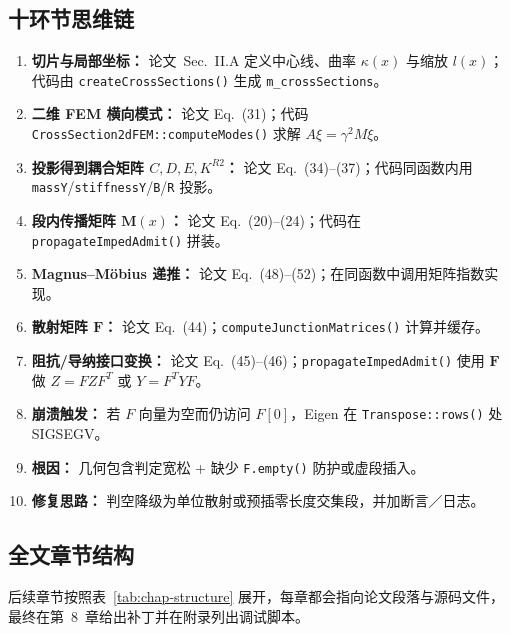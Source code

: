\documentclass{ctexart}
\begin{document}
\subsection{十环节思维链}
\begin{enumerate}[label=\arabic*.]
    \item \textbf{切片与局部坐标：} 论文~Sec.~II.A 定义中心线、曲率 $\kappa(x)$ 与缩放 $l(x)$；代码由 \texttt{createCrossSections()} 生成 \texttt{m\_crossSections}。
    \item \textbf{二维 FEM 横向模式：} 论文 Eq.~(31)；代码 \texttt{CrossSection2dFEM::computeModes()} 求解 $A\xi=\gamma^{2}M\xi$。
    \item \textbf{投影得到耦合矩阵 $C,D,E,K^{R2}$：} 论文 Eq.~(34)--(37)；代码同函数内用 \texttt{massY}/\texttt{stiffnessY}/\texttt{B}/\texttt{R} 投影。
    \item \textbf{段内传播矩阵 $\mathbf M(x)$：} 论文 Eq.~(20)--(24)；代码在 \texttt{propagateImpedAdmit()} 拼装。
    \item \textbf{Magnus--Möbius 递推：} 论文 Eq.~(48)--(52)；在同函数中调用矩阵指数实现。
    \item \textbf{散射矩阵 $\mathbf F$：} 论文 Eq.~(44)；\texttt{computeJunctionMatrices()} 计算并缓存。
    \item \textbf{阻抗/导纳接口变换：} 论文 Eq.~(45)--(46)；\texttt{propagateImpedAdmit()} 使用 $\mathbf F$ 做 $Z=FZF^{T}$ 或 $Y=F^{T}YF$。
    \item \textbf{崩溃触发：} 若 $F$ 向量为空而仍访问 $F[0]$，Eigen 在 \texttt{Transpose::rows()} 处 SIGSEGV。
    \item \textbf{根因：} 几何包含判定宽松 + 缺少 \texttt{F.empty()} 防护或虚段插入。
    \item \textbf{修复思路：} 判空降级为单位散射或预插零长度交集段，并加断言／日志。
\end{enumerate}

\subsection{全文章节结构}
后续章节按照表~\ref{tab:chap-structure} 展开，每章都会指向论文段落与源码文件，最终在第~8~章给出补丁并在附录列出调试脚本。
\end{document}

